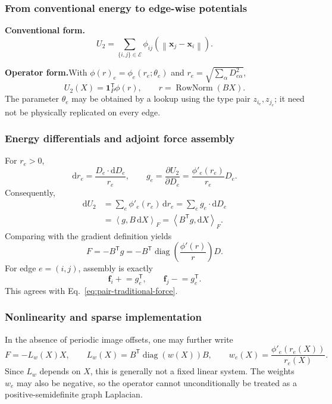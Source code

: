 \documentclass[11pt,a4paper]{article}
\newcommand{\oldform}{\par\noindent\textbf{Conventional form.}\quad}
\newcommand{\newform}{\par\noindent\textbf{Operator form.}\quad}
\newcommand{\ones}{\mathbf 1}
\newcommand{\dd}{\mathrm d}
\newcommand{\diag}{\operatorname{diag}}
\newcommand{\ip}[2]{\left\langle #1,#2\right\rangle}
\newcommand{\norm}[1]{\left\lVert #1\right\rVert}
\newcommand{\vect}[1]{\bm{#1}}
\theoremstyle{definition}
\begin{document}
\subsubsection{From conventional energy to edge-wise potentials}
\oldform
\begin{equation}
U_2=\sum_{\{i,j\}\in\mathcal E}\phi_{ij}(\norm{\vect x_j-\vect x_i}).
\end{equation}
\newform With $\phi(r)_e=\phi_e(r_e;\theta_e)$ and $r_e=\sqrt{\sum_\alpha D_{e\alpha}^2}$,
\begin{equation}
U_2(X)=\ones_P^{\mathsf T}\phi(r),\qquad r=\operatorname{RowNorm}(BX).
\label{eq:pair-reform-energy}
\end{equation}
The parameter $\theta_e$ may be obtained by a lookup using the type pair $z_{i_e},z_{j_e}$; it
need not be physically replicated on every edge.

\subsubsection{Energy differentials and adjoint force assembly}
For $r_e>0$,
\begin{equation}
\dd r_e=\frac{D_e\cdot\dd D_e}{r_e},\qquad
g_e=\frac{\partial U_2}{\partial D_e}
=\frac{\phi'_e(r_e)}{r_e}D_e.
\end{equation}
Consequently,
\begin{align}
\dd U_2
&=\sum_e\phi'_e(r_e)\,\dd r_e
=\sum_e g_e\cdot\dd D_e\\
&=\ip{g}{B\,\dd X}_F
=\ip{B^{\mathsf T}g}{\dd X}_F.\nonumber
\end{align}
Comparing with the gradient definition yields
\begin{equation}
F=-B^{\mathsf T}g
=-B^{\mathsf T}\diag\!\left(\frac{\phi'(r)}{r}\right)D.
\label{eq:pair-reform-force}
\end{equation}
For edge $e=(i,j)$, assembly is exactly
\begin{equation}
\vect f_i\mathrel{+}=g_e^{\mathsf T},\qquad
\vect f_j\mathrel{-}=g_e^{\mathsf T}.
\label{eq:pair-endpoints}
\end{equation}
This agrees with Eq.~\eqref{eq:pair-traditional-force}.

\subsubsection{Nonlinearity and sparse implementation}
In the absence of periodic image offsets, one may further write
\begin{equation}
F=-L_w(X)X,\qquad
L_w(X)=B^{\mathsf T}\diag(w(X))B,\qquad
w_e(X)=\frac{\phi'_e(r_e(X))}{r_e(X)}.
\label{eq:nonlinear-laplacian}
\end{equation}
Since $L_w$ depends on $X$, this is generally not a fixed linear system. The weights $w_e$ may
also be negative, so the operator cannot unconditionally be treated as a positive-semidefinite graph
Laplacian.
\end{document}
